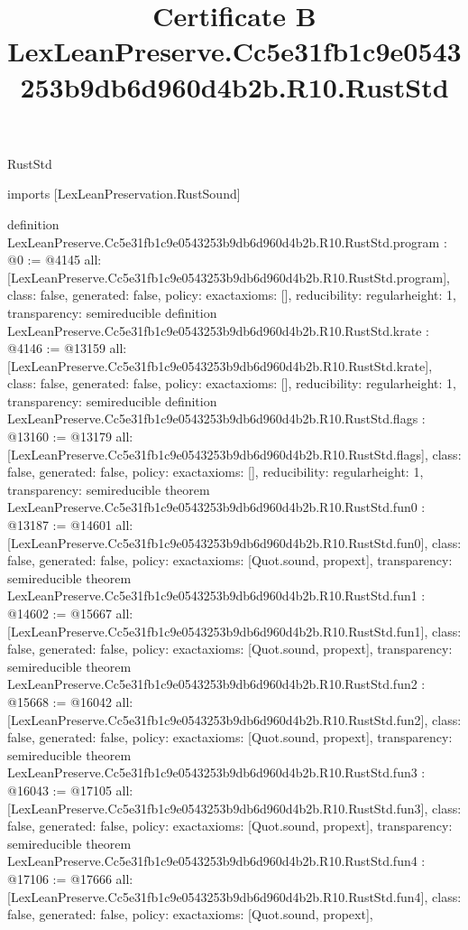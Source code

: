 \begin{lexlean}{RustStd}
\title{Certificate B LexLeanPreserve.Cc5e31fb1c9e0543253b9db6d960d4b2b.R10.RustStd}
\begin{coremodule}
imports [LexLeanPreservation.RustSound]

definition LexLeanPreserve.Cc5e31fb1c9e0543253b9db6d960d4b2b.R10.RustStd.program : @0 := @4145 {
  all: [LexLeanPreserve.Cc5e31fb1c9e0543253b9db6d960d4b2b.R10.RustStd.program],
  class: false,
  generated: false,
  policy: exact{axioms: []},
  reducibility: regular{height: 1},
  transparency: semireducible
}
definition LexLeanPreserve.Cc5e31fb1c9e0543253b9db6d960d4b2b.R10.RustStd.krate : @4146 := @13159 {
  all: [LexLeanPreserve.Cc5e31fb1c9e0543253b9db6d960d4b2b.R10.RustStd.krate],
  class: false,
  generated: false,
  policy: exact{axioms: []},
  reducibility: regular{height: 1},
  transparency: semireducible
}
definition LexLeanPreserve.Cc5e31fb1c9e0543253b9db6d960d4b2b.R10.RustStd.flags : @13160 := @13179 {
  all: [LexLeanPreserve.Cc5e31fb1c9e0543253b9db6d960d4b2b.R10.RustStd.flags],
  class: false,
  generated: false,
  policy: exact{axioms: []},
  reducibility: regular{height: 1},
  transparency: semireducible
}
theorem LexLeanPreserve.Cc5e31fb1c9e0543253b9db6d960d4b2b.R10.RustStd.fun0 : @13187 := @14601 {
  all: [LexLeanPreserve.Cc5e31fb1c9e0543253b9db6d960d4b2b.R10.RustStd.fun0],
  class: false,
  generated: false,
  policy: exact{axioms: [Quot.sound, propext]},
  transparency: semireducible
}
theorem LexLeanPreserve.Cc5e31fb1c9e0543253b9db6d960d4b2b.R10.RustStd.fun1 : @14602 := @15667 {
  all: [LexLeanPreserve.Cc5e31fb1c9e0543253b9db6d960d4b2b.R10.RustStd.fun1],
  class: false,
  generated: false,
  policy: exact{axioms: [Quot.sound, propext]},
  transparency: semireducible
}
theorem LexLeanPreserve.Cc5e31fb1c9e0543253b9db6d960d4b2b.R10.RustStd.fun2 : @15668 := @16042 {
  all: [LexLeanPreserve.Cc5e31fb1c9e0543253b9db6d960d4b2b.R10.RustStd.fun2],
  class: false,
  generated: false,
  policy: exact{axioms: [Quot.sound, propext]},
  transparency: semireducible
}
theorem LexLeanPreserve.Cc5e31fb1c9e0543253b9db6d960d4b2b.R10.RustStd.fun3 : @16043 := @17105 {
  all: [LexLeanPreserve.Cc5e31fb1c9e0543253b9db6d960d4b2b.R10.RustStd.fun3],
  class: false,
  generated: false,
  policy: exact{axioms: [Quot.sound, propext]},
  transparency: semireducible
}
theorem LexLeanPreserve.Cc5e31fb1c9e0543253b9db6d960d4b2b.R10.RustStd.fun4 : @17106 := @17666 {
  all: [LexLeanPreserve.Cc5e31fb1c9e0543253b9db6d960d4b2b.R10.RustStd.fun4],
  class: false,
  generated: false,
  policy: exact{axioms: [Quot.sound, propext]},
}
\end{coremodule}
\end{lexlean}
